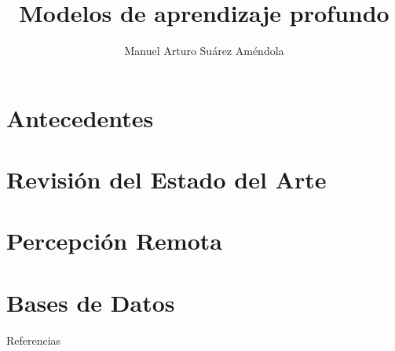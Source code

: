 \documentclass[11pt]{beamer}
\title[Seminario de UAM]
{Modelos de aprendizaje profundo}
\author[Suárez, M.A.]{Manuel Arturo Suárez Améndola}
\begin{document}


\section{Antecedentes}


\section{Revisión del Estado del Arte}


\section{Percepción Remota}


\section{Bases de Datos}


\nocite{*}
\begin{frame}[allowframebreaks]{Referencias}


\end{frame}
\end{document}
